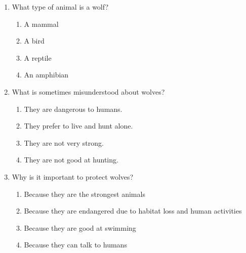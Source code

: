 \documentclass[12pt]{article}
\begin{document}
\begin{enumerate}
    \vspace{0.5cm}

    \item What type of animal is a wolf?

    \begin{enumerate}[label=\Alph*.]
        \item A mammal
        \item A bird
        \item A reptile
        \item An amphibian
    \end{enumerate}

    \vspace{0.5cm}

    \item What is sometimes misunderstood about wolves?

    \begin{enumerate}[label=\Alph*.]
        \item They are dangerous to humans.
        \item They prefer to live and hunt alone.
        \item They are not very strong.
        \item They are not good at hunting.
    \end{enumerate}

    \vspace{0.5cm}

    \item Why is it important to protect wolves?

    \begin{enumerate}[label=\Alph*.]
        \item Because they are the strongest animals
        \item Because they are endangered due to habitat loss and human activities
        \item Because they are good at swimming
        \item Because they can talk to humans
    \end{enumerate}
    \vspace{0.5cm}
\end{enumerate}
    \newpage
\end{document}
